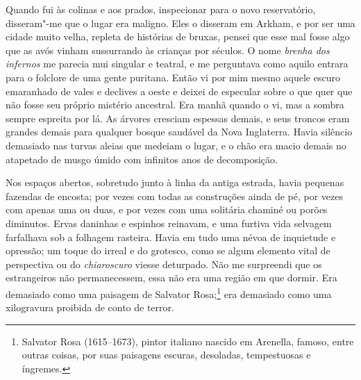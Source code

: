 Quando fui às colinas e aos prados, inspecionar para o novo
reservatório, disseram"-me que o lugar era maligno. Eles o disseram em
Arkham, e por ser uma cidade muito velha, repleta de histórias de
bruxas, pensei que esse mal fosse algo que as avós vinham sussurrando às
crianças por séculos. O nome \textit{brenha dos infernos} me parecia mui
singular e teatral, e me perguntava como aquilo entrara para o folclore
de uma gente puritana. Então vi por mim mesmo aquele escuro emaranhado
de vales e declives a oeste e deixei de especular sobre o que quer que
não fosse seu próprio mistério ancestral. Era manhã quando o vi, mas a
sombra sempre espreita por lá. As árvores cresciam espessas demais, e
seus troncos eram grandes demais para qualquer bosque saudável da Nova
Inglaterra. Havia silêncio demasiado nas turvas aleias que medeiam o
lugar, e o chão era macio demais no atapetado de musgo úmido com
infinitos anos de decomposição.

Nos espaços abertos, sobretudo junto à linha da antiga estrada, havia
pequenas fazendas de encosta; por vezes com todas as construções ainda
de pé, por vezes com apenas uma ou duas, e por vezes com uma solitária
chaminé ou porões diminutos. Ervas daninhas e espinhos reinavam, e uma
furtiva vida selvagem farfalhava sob a folhagem rasteira. Havia em tudo
uma névoa de inquietude e opressão; um toque do irreal e do grotesco,
como se algum elemento vital de perspectiva ou do \textit{chiaroscuro}
viesse deturpado. Não me surpreendi que os estrangeiros não
permanecessem, essa não era uma região em que dormir. Era demasiado como
uma paisagem de Salvator Rosa;\footnote{Salvator Rosa (1615--1673), pintor
  italiano nascido em Arenella, famoso, entre outras coisas, por suas
  paisagens escuras, desoladas, tempestuosas e íngremes.} era demasiado
como uma xilogravura proibida de conto de terror.

